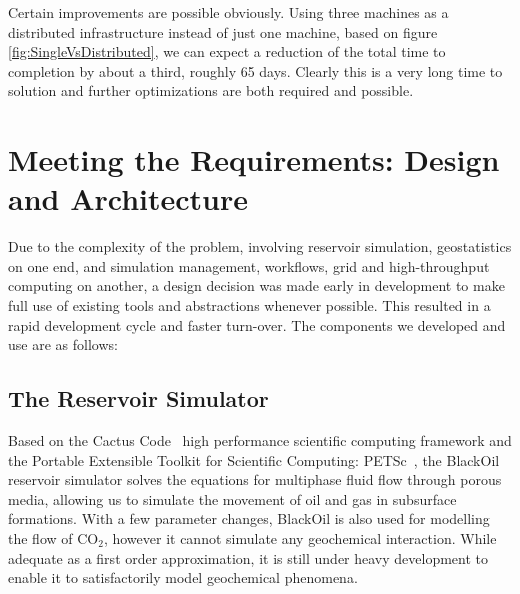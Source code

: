 \documentclass{acm_proc_article-sp}
\newcommand{\up}{\vspace*{-0.3em}}
\begin{document}
Certain improvements are possible obviously. Using three machines as a
distributed infrastructure instead of just one machine, based on figure
\ref{fig:SingleVsDistributed}, we can expect a reduction of the total
time to completion by about a third, roughly 65 days. Clearly this is
a very long time to solution and further optimizations are both
required and possible.
\up\up
% 

\up\up
\section{Meeting the Requirements: Design and Architecture}

Due to the complexity of the problem, involving reservoir simulation,
geostatistics on one end, and simulation management, workflows, grid
and high-throughput computing on another, a design decision was made
early in development to make full use of existing tools and
abstractions whenever possible. This resulted in a rapid development
cycle and faster turn-over. The components we developed and use are as
follows:

\subsection{The Reservoir Simulator} 

Based on the Cactus Code~\cite{cactus_web} high performance
scientific computing framework and the Portable Extensible Toolkit for
Scientific Computing: PETSc~\cite{PETSc}, the BlackOil reservoir
simulator solves the equations for multiphase fluid flow through
porous media, allowing us to simulate the movement of oil and gas in
subsurface formations. With a few parameter changes, BlackOil is also
used for modelling the flow of CO$_2$, however it cannot simulate any
geochemical interaction. While adequate as a first order
approximation, it is still under heavy development to enable it to
satisfactorily model geochemical phenomena.
\end{document}
